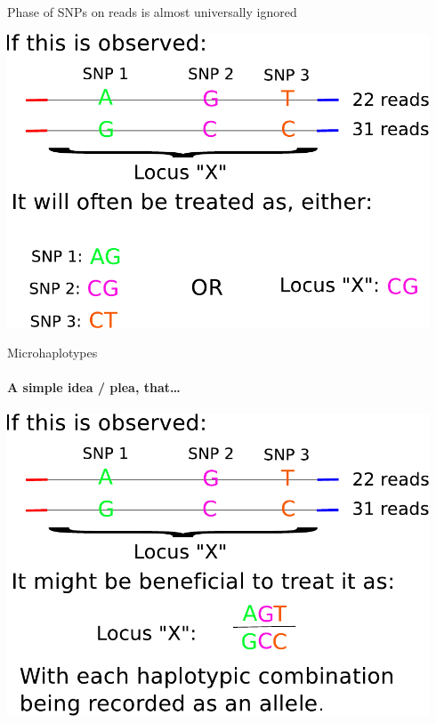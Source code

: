 \documentclass[letter,graphicx]{beamer}
\begin{document}
\begin{frame}{Phase of SNPs on reads is almost universally ignored}
\begin{center}
\includegraphics[width=0.94\textwidth]{figs/three-snp-reads.pdf}
\end{center}
\end{frame}













\begin{frame}{Microhaplotypes}
\framesubtitle{A simple idea / plea, that\ldots}
\begin{center}
\includegraphics[width=0.94\textwidth]{figs/three-snp-reads-mhap.pdf}
\end{center}
\end{frame}
\end{document}
